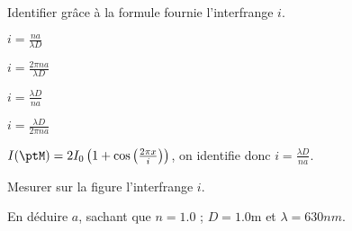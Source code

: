 \debutEntrainement

\clearpage


\begin{enonce}
Identifier grâce à la formule fournie l'interfrange $i$.
\begin{listeQCM4Colonnes}
	\item $i=\frac{na}{\lambda D}$
	\item $i=\frac{2\pi na}{\lambda D}$
	\item $i=\frac{\lambda D}{na}$
	\item $i=\frac{\lambda D}{2\pi na}$
\end{listeQCM4Colonnes}
\bigskip
\end{enonce}



\reponse{\reponseC{}}

\begin{corrige}
	$I(\ptM)=2I_0 \left(1+\cos\left(\frac{2\pi x}{i}\right)\right)$, on identifie donc $i=\frac{\lambda D}{na}$.
\end{corrige}




\begin{enonce}
Mesurer sur la figure l'interfrange $i$.
\end{enonce}






\begin{enonce}
En déduire $a$, sachant que $n=\num{1.0}$ ; $D=\num{1.0}\si{\metre}$ et $\lambda=\num{630}\si{nm}$.
\end{enonce}

